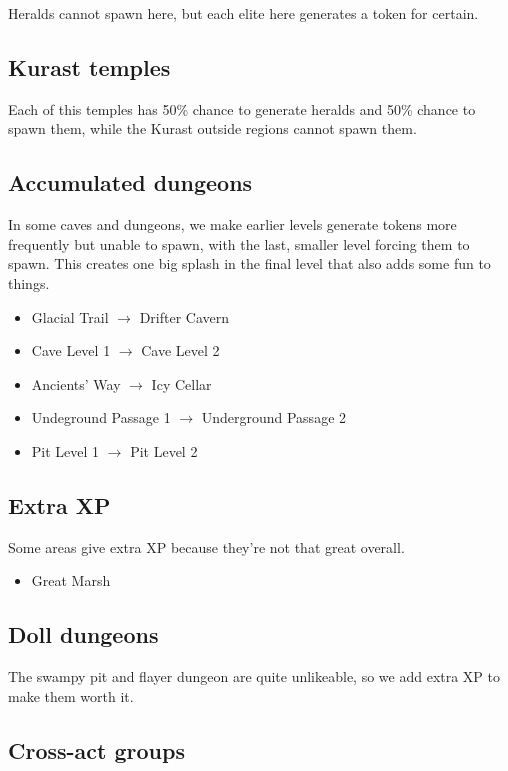 \documentclass[12pt,a4paper]{article}
\begin{document}
Heralds cannot spawn here, but each elite here generates a token for certain.

\subsection{Kurast temples}

Each of this temples has 50\% chance to generate heralds and 50\% chance to spawn them, while the Kurast outside regions cannot spawn them.

\subsection{Accumulated dungeons}

In some caves and dungeons, we make earlier levels generate tokens more frequently but unable to spawn, with the last, smaller level forcing them to spawn. This creates one big splash in the final level that also adds some fun to things.

\begin{itemize}
\item Glacial Trail $\rightarrow$ Drifter Cavern
\item Cave Level 1 $\rightarrow$ Cave Level 2
\item Ancients' Way $\rightarrow$ Icy Cellar
\item Undeground Passage 1 $\rightarrow$ Underground Passage 2
\item Pit Level 1 $\rightarrow$ Pit Level 2
\end{itemize}

\subsection{Extra XP}

Some areas give extra XP because they're not that great overall.

\begin{itemize}
\item Great Marsh
\end{itemize}

\subsection{Doll dungeons}

The swampy pit and flayer dungeon are quite unlikeable, so we add extra XP to make them worth it.

\subsection{Cross-act groups}
\end{document}
